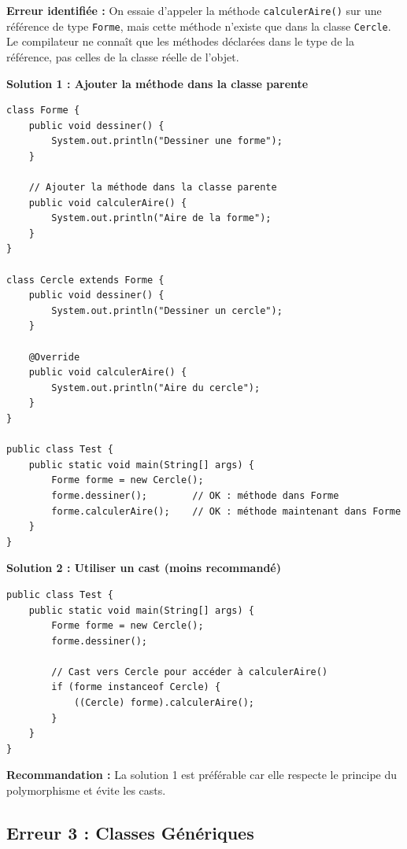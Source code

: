 \documentclass[11pt,a4paper]{article}
\begin{document}
\begin{correctionbox}
\textbf{Erreur identifiée :} On essaie d'appeler la méthode \texttt{calculerAire()} sur une référence de type \texttt{Forme}, mais cette méthode n'existe que dans la classe \texttt{Cercle}. Le compilateur ne connaît que les méthodes déclarées dans le type de la référence, pas celles de la classe réelle de l'objet.

\textbf{Solution 1 : Ajouter la méthode dans la classe parente}

\begin{lstlisting}
class Forme {
    public void dessiner() {
        System.out.println("Dessiner une forme");
    }
    
    // Ajouter la méthode dans la classe parente
    public void calculerAire() {
        System.out.println("Aire de la forme");
    }
}

class Cercle extends Forme {
    public void dessiner() {
        System.out.println("Dessiner un cercle");
    }
    
    @Override
    public void calculerAire() {
        System.out.println("Aire du cercle");
    }
}

public class Test {
    public static void main(String[] args) {
        Forme forme = new Cercle();
        forme.dessiner();        // OK : méthode dans Forme
        forme.calculerAire();    // OK : méthode maintenant dans Forme
    }
}
\end{lstlisting}

\textbf{Solution 2 : Utiliser un cast (moins recommandé)}

\begin{lstlisting}
public class Test {
    public static void main(String[] args) {
        Forme forme = new Cercle();
        forme.dessiner();
        
        // Cast vers Cercle pour accéder à calculerAire()
        if (forme instanceof Cercle) {
            ((Cercle) forme).calculerAire();
        }
    }
}
\end{lstlisting}

\textbf{Recommandation :} La solution 1 est préférable car elle respecte le principe du polymorphisme et évite les casts.
\end{correctionbox}

\subsection{Erreur 3 : Classes Génériques}
\end{document}
